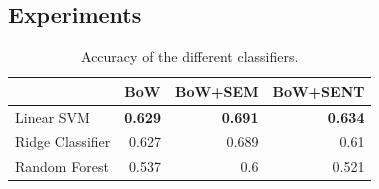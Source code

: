 

\subsection{Experiments}

\begin{table}[]
\centering
\begin{tabular}{l r r r}
\cline{2-4}
& \multicolumn{1}{l}{BoW} & \multicolumn{1}{l}{BoW+SEM} & \multicolumn{1}{l}{BoW+SENT} \\ 
\hline
Linear SVM       & \textbf{0.629}           & \textbf{0.691}               & \textbf{0.634}                \\ \hline
Ridge Classifier & 0.627                    & 0.689                        & 0.61                          \\ \hline
Random Forest    & 0.537                    & 0.6                          & 0.521                         \\ \hline
\end{tabular}
\caption{Accuracy of the different classifiers.}
\label{tbl:similarity:classifiers}
\end{table}

